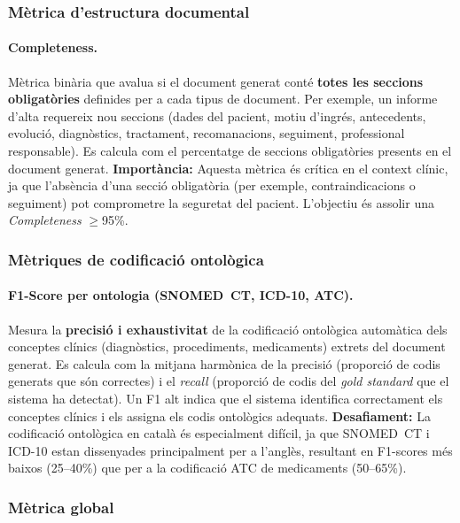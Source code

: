 \documentclass[CAT]{TFUOC}%
\begin{document}
\subsubsection{Mètrica d'estructura documental}

\paragraph{Completeness.}
Mètrica binària que avalua si el document generat conté \textbf{totes les seccions obligatòries} definides per a cada tipus de document. Per exemple, un informe d'alta requereix nou seccions (dades del pacient, motiu d'ingrés, antecedents, evolució, diagnòstics, tractament, recomanacions, seguiment, professional responsable). Es calcula com el percentatge de seccions obligatòries presents en el document generat. \textbf{Importància:} Aquesta mètrica és crítica en el context clínic, ja que l'absència d'una secció obligatòria (per exemple, contraindicacions o seguiment) pot comprometre la seguretat del pacient. L'objectiu és assolir una \textit{Completeness} $\geq$95\%.

\subsubsection{Mètriques de codificació ontològica}

\paragraph{F1-Score per ontologia (SNOMED~CT, ICD-10, ATC).}
Mesura la \textbf{precisió i exhaustivitat} de la codificació ontològica automàtica dels conceptes clínics (diagnòstics, procediments, medicaments) extrets del document generat. Es calcula com la mitjana harmònica de la precisió (proporció de codis generats que són correctes) i el \textit{recall} (proporció de codis del \textit{gold standard} que el sistema ha detectat). Un F1 alt indica que el sistema identifica correctament els conceptes clínics i els assigna els codis ontològics adequats. \textbf{Desafiament:} La codificació ontològica en català és especialment difícil, ja que SNOMED~CT i ICD-10 estan dissenyades principalment per a l'anglès, resultant en F1-scores més baixos (25--40\%) que per a la codificació ATC de medicaments (50--65\%).

\subsubsection{Mètrica global}
\end{document}

